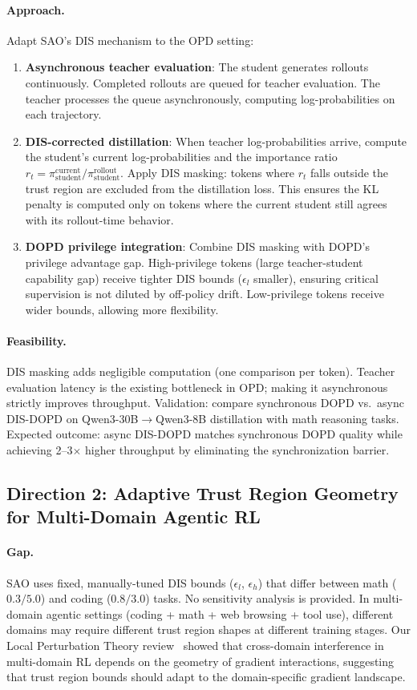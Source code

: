\documentclass[11pt,a4paper]{article}
\begin{document}
\paragraph{Approach.} Adapt SAO's DIS mechanism to the OPD setting:
\begin{enumerate}
\item \textbf{Asynchronous teacher evaluation}: The student generates rollouts continuously. Completed rollouts are queued for teacher evaluation. The teacher processes the queue asynchronously, computing log-probabilities on each trajectory.
\item \textbf{DIS-corrected distillation}: When teacher log-probabilities arrive, compute the student's current log-probabilities and the importance ratio $r_t = \pi_{\mathrm{student}}^{\mathrm{current}} / \pi_{\mathrm{student}}^{\mathrm{rollout}}$. Apply DIS masking: tokens where $r_t$ falls outside the trust region are excluded from the distillation loss. This ensures the KL penalty is computed only on tokens where the current student still agrees with its rollout-time behavior.
\item \textbf{DOPD privilege integration}: Combine DIS masking with DOPD's privilege advantage gap. High-privilege tokens (large teacher-student capability gap) receive tighter DIS bounds ($\epsilon_l$ smaller), ensuring critical supervision is not diluted by off-policy drift. Low-privilege tokens receive wider bounds, allowing more flexibility.
\end{enumerate}

\paragraph{Feasibility.} DIS masking adds negligible computation (one comparison per token). Teacher evaluation latency is the existing bottleneck in OPD; making it asynchronous strictly improves throughput. Validation: compare synchronous DOPD vs.\ async DIS-DOPD on Qwen3-30B$\to$Qwen3-8B distillation with math reasoning tasks. Expected outcome: async DIS-DOPD matches synchronous DOPD quality while achieving 2--3$\times$ higher throughput by eliminating the synchronization barrier.

\subsection{Direction 2: Adaptive Trust Region Geometry for Multi-Domain Agentic RL}

\paragraph{Gap.} SAO uses fixed, manually-tuned DIS bounds ($\epsilon_l$, $\epsilon_h$) that differ between math ($0.3/5.0$) and coding ($0.8/3.0$) tasks. No sensitivity analysis is provided. In multi-domain agentic settings (coding + math + web browsing + tool use), different domains may require different trust region shapes at different training stages. Our Local Perturbation Theory review~\cite{localpert2026} showed that cross-domain interference in multi-domain RL depends on the geometry of gradient interactions, suggesting that trust region bounds should adapt to the domain-specific gradient landscape.
\end{document}
